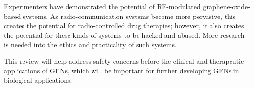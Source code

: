 \documentclass[twoside,twocolumn,9pt]{article}
\renewcommand{\refname}{Notes and references}
\begin{document}
Experimenters have demonstrated the potential of RF-modulated graphene-oxide-based systems. As radio-communication systems become more pervasive, this creates the potential for radio-controlled drug therapies; however, it also creates the potential for these kinds of systems to be hacked and abused. More research is needed into the ethics and practicality of such systems. 

This review will help address safety concerns before the clinical and therapeutic applications of GFNs, which will be important for further developing GFNs in biological applications.



\balance


\end{document}
